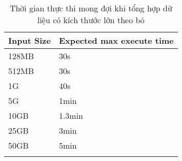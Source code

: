 \begin{longtable}{|l|l|}
\hline
Input Size & Expected max execute time \\ \hline
\endhead
%
128MB                             & 30s                       \\ \hline
512MB                             & 30s                       \\ \hline
1G                                & 40s                       \\ \hline
5G                                & 1min                      \\ \hline
10GB                              & 1.3min                    \\ \hline
25GB                              & 3min                      \\ \hline
50GB                              & 5min                      \\ \hline
\caption{Thời gian thực thi mong đợi khi tổng hợp dữ liệu có kích thước lớn theo bó}
\end{longtable}